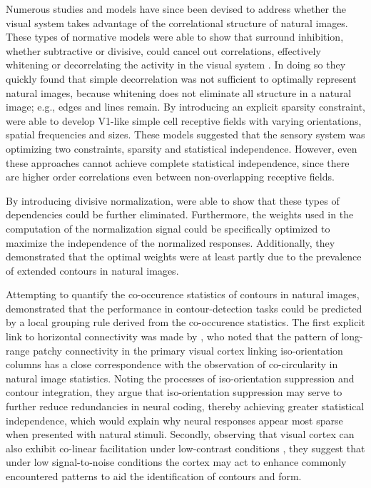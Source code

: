 Numerous studies and models have since been devised to address whether
the visual system takes advantage of the correlational structure of
natural images. These types of normative models were able to show that
surround inhibition, whether subtractive or divisive, could cancel out
correlations, effectively whitening or decorrelating the activity in
the visual system \citep{Srinivasan1982, Atick1992}. In doing so they
quickly found that simple decorrelation was not sufficient to
optimally represent natural images, because whitening does not
eliminate all structure in a natural image; e.g., edges and lines
remain. By introducing an explicit sparsity constraint,
\cite{Olshausen1996} were able to develop V1-like simple cell
receptive fields with varying orientations, spatial frequencies and
sizes. These models suggested that the sensory system was optimizing
two constraints, sparsity and statistical independence. However, even
these approaches cannot achieve complete statistical independence,
since there are higher order correlations even between non-overlapping
receptive fields.

By introducing divisive normalization, \cite{Schwartz2001a} were able
to show that these types of dependencies could be further
eliminated. Furthermore, the weights used in the computation of the
normalization signal could be specifically optimized to maximize the
independence of the normalized responses. Additionally, they
demonstrated that the optimal weights were at least partly due to the
prevalence of extended contours in natural images.

Attempting to quantify the co-occurence statistics of contours in
natural images, \cite{Geisler2001} demonstrated that the performance
in contour-detection tasks could be predicted by a local grouping rule
derived from the co-occurence statistics. The first explicit link to
horizontal connectivity was made by \cite{Sigman2001}, who noted that
the pattern of long-range patchy connectivity in the primary visual
cortex linking iso-orientation columns has a close correspondence with
the observation of co-circularity in natural image statistics. Noting
the processes of iso-orientation suppression and contour integration,
they argue that iso-orientation suppression may serve to further
reduce redundancies in neural coding, thereby achieving greater
statistical independence, which would explain why neural responses
appear most sparse when presented with natural stimuli. Secondly,
observing that visual cortex can also exhibit co-linear facilitation
under low-contrast conditions \citep{Sceniak1999, Kapadia1999}, they
suggest that under low signal-to-noise conditions the cortex may act
to enhance commonly encountered patterns to aid the identification of
contours and form.

